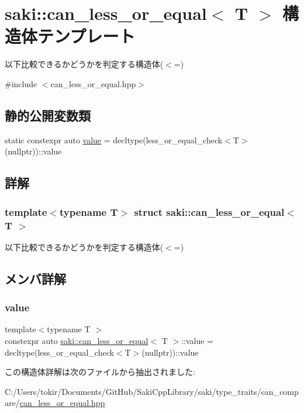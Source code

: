 \hypertarget{structsaki_1_1can__less__or__equal}{}\section{saki\+:\+:can\+\_\+less\+\_\+or\+\_\+equal$<$ T $>$ 構造体テンプレート}
\label{structsaki_1_1can__less__or__equal}


以下比較できるかどうかを判定する構造体($<$=)  




{\ttfamily \#include $<$can\+\_\+less\+\_\+or\+\_\+equal.\+hpp$>$}

\subsection*{静的公開変数類}
\begin{DoxyCompactItemize}
\item 
static constexpr auto \mbox{\hyperlink{structsaki_1_1can__less__or__equal_a5a0b1635454596a925eae248a7c7d94d}{value}} = decltype(less\+\_\+or\+\_\+equal\+\_\+check$<$T$>$(nullptr))\+::value
\end{DoxyCompactItemize}


\subsection{詳解}
\subsubsection*{template$<$typename T$>$\newline
struct saki\+::can\+\_\+less\+\_\+or\+\_\+equal$<$ T $>$}

以下比較できるかどうかを判定する構造体($<$=) 

\subsection{メンバ詳解}
\mbox{\label{structsaki_1_1can__less__or__equal_a5a0b1635454596a925eae248a7c7d94d}} 
\subsubsection{\texorpdfstring{value}{value}}
{\footnotesize\ttfamily template$<$typename T $>$ \\
constexpr auto \mbox{\hyperlink{structsaki_1_1can__less__or__equal}{saki\+::can\+\_\+less\+\_\+or\+\_\+equal}}$<$ T $>$\+::value = decltype(less\+\_\+or\+\_\+equal\+\_\+check$<$T$>$(nullptr))\+::value\hspace{0.3cm}{\ttfamily [static]}}



この構造体詳解は次のファイルから抽出されました\+:\begin{DoxyCompactItemize}
\item 
C\+:/\+Users/tokir/\+Documents/\+Git\+Hub/\+Saki\+Cpp\+Library/saki/type\+\_\+traits/can\+\_\+compare/\mbox{\hyperlink{can__less__or__equal_8hpp}{can\+\_\+less\+\_\+or\+\_\+equal.\+hpp}}\end{DoxyCompactItemize}
